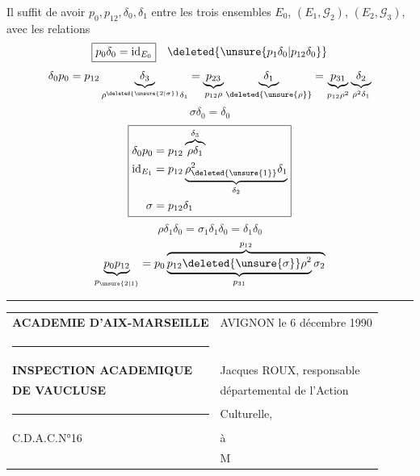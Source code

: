  Il suffit de avoir $p_0,p_{12},\delta_0,\delta_1$ entre les trois ensembles $E_0$, $(E_1,\mathcal G_2)$, $(E_2,\mathcal G_3)$, avec les relations
\[\boxed{p_0\delta_0=\mathrm{id}_{E_0}}\quad\deleted{\unsure{p_1\delta_0|p_{12}\delta_0}}\]
\[\delta_0p_0=p_{12}\underbrace{\delta_3}_{\rho^{\deleted{\unsure{2|\sigma}}}\delta_1}=\underbrace{p_{23}}_{p_{12}\rho}\underbrace{\delta_1}_{\deleted{\unsure{\rho}}}=\underbrace{p_{31}}_{p_{12}\rho^2}\underbrace{\delta_2}_{\rho^2\delta_1}\]
\[\boxed{\sigma\delta_0=\delta_0}\]
\deleted{\[\text{i.e.}\quad\underbrace{\delta_0p_0}=\underbrace{p_{12}\delta_1}_{\sigma}=\underbrace{p_{12}\rho\delta_1}_{\mathrm{id}}=\underbrace{p_{12}\rho^2\delta_1}\]}
\[\boxed{\begin{aligned}
\delta_0p_0&=p_{12}\overbrace{\rho\delta_1}^{\delta_3}\\
\mathrm{id}_{E_1}&=p_{12}\underbrace{\rho_{\deleted{\unsure{1}}}^{2}\delta_1}_{\delta_2}\\
\sigma&=p_{12}\delta_1
\end{aligned}}\]
\[\boxed{\rho\delta_1\delta_0=\sigma_1\delta_1\delta_0=\delta_1\delta_0}\]
\[\underbrace{p_0p_{12}}_{p_{\unsure{2|1}}}=p_0\overbrace{\underbrace{p_{12}\deleted{\unsure{\sigma}}\rho^2}_{p_{31}}\sigma_2}^{p_{12}}\]

\hrule
\begin{tabular}{p{.47\linewidth}p{.47\linewidth}}
\textbf{ACADEMIE D'AIX-MARSEILLE} & AVIGNON le 6 décembre 1990\\
\rule{3cm}{.4pt}&\\
\textbf{INSPECTION ACADEMIQUE} & Jacques ROUX, responsable\\
\textbf{DE VAUCLUSE}&départemental de l'Action\\
\rule{1cm}{.4pt}&Culturelle,\\[1em]
C.D.A.C.N°16&à\\[1em]
&M
\end{tabular}

